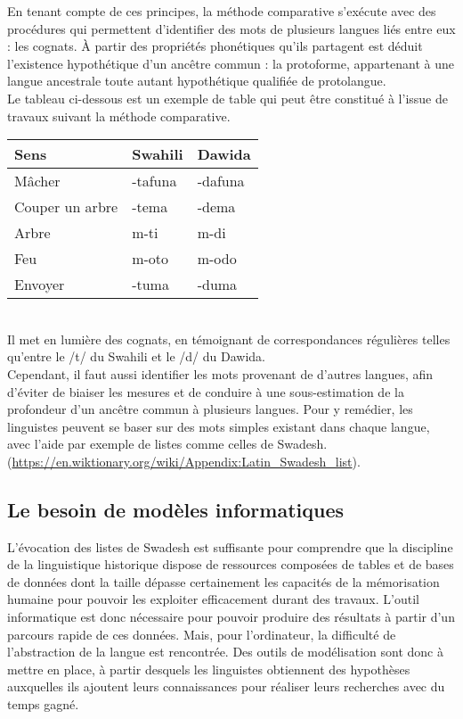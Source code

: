 \documentclass[12pt, twoside]{report}
\begin{document}
En tenant compte de ces principes, la méthode comparative s'exécute avec des procédures qui permettent d'identifier des mots de plusieurs langues liés entre eux : les \glspl{cognat}. À partir des propriétés phonétiques qu'ils partagent est déduit l'existence hypothétique d'un ancêtre commun : la \gls{protoforme}, appartenant à une langue ancestrale toute autant hypothétique qualifiée de protolangue.\\
Le tableau ci-dessous est un exemple de table qui peut être constitué à l'issue de travaux suivant la méthode comparative.

\begin{tabularx}{0.8\textwidth} {
  | >{\centering\arraybackslash}X
  | >{\centering\arraybackslash}X
  | >{\centering\arraybackslash}X | }
\hline
 Sens & Swahili & Dawida \\
\hline
Mâcher  & -tafuna  & -dafuna  \\
\hline
Couper un arbre & -tema & -dema \\
\hline
Arbre & m-ti & m-di \\
\hline
Feu & m-oto & m-odo\\
\hline
Envoyer & -tuma & -duma \\
\hline
\end{tabularx}\\

Il met en lumière des cognats, en témoignant de correspondances régulières telles qu'entre le /t/ du Swahili et le /d/ du Dawida.\\ 

Cependant, il faut aussi identifier les mots provenant de d'autres langues, afin d'éviter de biaiser les mesures et de conduire à une sous-estimation de la profondeur d'un ancêtre commun à plusieurs langues. Pour y remédier, les linguistes peuvent se baser sur des mots simples existant dans chaque langue, avec l'aide par exemple de listes comme celles de Swadesh. (\url{https://en.wiktionary.org/wiki/Appendix:Latin_Swadesh_list}).\\ 

\subsection{Le besoin de modèles informatiques}

L'évocation des listes de Swadesh est suffisante pour comprendre que la discipline de la linguistique historique dispose de ressources composées de tables et de bases de données dont la taille dépasse certainement les capacités de la mémorisation humaine pour pouvoir les exploiter efficacement durant des travaux. L'outil informatique est donc nécessaire pour pouvoir produire des résultats à partir d'un parcours rapide de ces données. Mais, pour l'ordinateur, la difficulté de l'abstraction de la langue est rencontrée. Des outils de modélisation sont donc à mettre en place, à partir desquels les linguistes obtiennent des hypothèses auxquelles ils ajoutent leurs connaissances pour réaliser leurs recherches avec du temps gagné.
\end{document}
